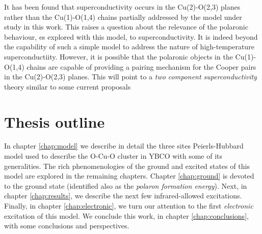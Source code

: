 It has been found that superconductivity occurs in the Cu(2)-O(2,3) planes rather than the Cu(1)-O(1,4) chains partially addressed by the model under study in this work.
This raises a question about the relevance of the polaronic behaviour, es explored with this model, to superconductivity.
It is indeed beyond the capability of such a simple model to address the nature of high-temperature superconductiity.
However, it is possible that the polaronic objects in the Cu(1)-O(1,4) chains are capable of providing a pairing mechanism for the Cooper pairs in the Cu(2)-O(2,3) planes.
This will point to a \textit{two component superconductivity} theory similar to some current proposals \cite{?}

\section{Thesis outline}
\label{sec:outline}


In chapter \ref{chap:model} we describe in detail the three sites Peierls-Hubbard model used to describe the O-Cu-O cluster in YBCO with some of its generalities. 
The rich phenomenologies of the ground and excited states of this model are explored in the remaining chapters. 
Chapter \ref{chap:ground} is devoted to the ground state (identified also as the \textit{polaron formation energy}). 
Next, in chapter \ref{chap:results}, we describe the next few infrared-allowed excitations. 
Finally, in chapter \ref{chap:electronic}, we turn our attention to the first \textit{electronic} excitation of this model. 
We conclude this work, in chapter \ref{chap:conclusions}, with some conclusions and perspectives.
